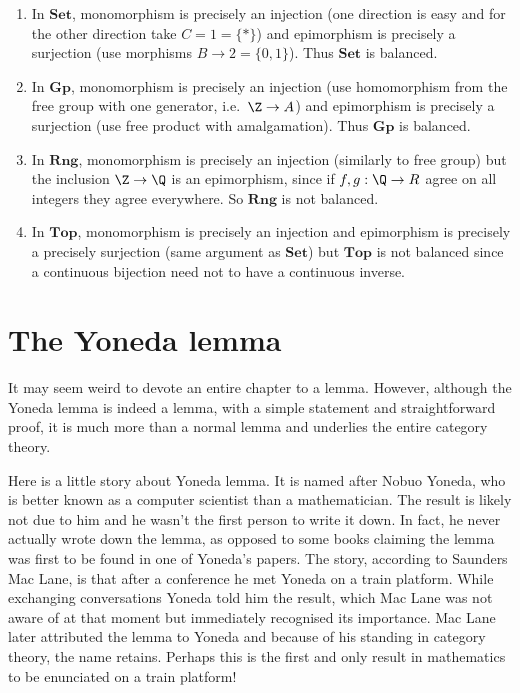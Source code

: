 \documentclass[a4paper]{article}
\renewcommand{\c}[1]{\mathbf{#1}}
\newcommand{\Set}{{\c{Set}}}
\newcommand{\Top}{{\c{Top}}}
\begin{document}
\begin{eg}\leavevmode
  \begin{enumerate}
  \item In \(\Set\), monomorphism is precisely an injection (one direction is easy and for the other direction take \(C = 1 = \{*\}\)) and epimorphism is precisely a surjection (use morphisms \(B \to 2 = \{0, 1\}\)). Thus \(\Set\) is balanced.
  \item In \(\c{Gp}\), monomorphism is precisely an injection (use homomorphism from the free group with one generator, i.e.\ \(\Z \to A\)) and epimorphism is precisely a surjection (use free product with amalgamation). Thus \(\c{Gp}\) is balanced.
  \item In \(\c{Rng}\), monomorphism is precisely an injection (similarly to free group) but the inclusion \(\Z \to \Q\) is an epimorphism, since if \(f, g: \Q \to R\) agree on all integers they agree everywhere. So \(\c{Rng}\) is not balanced.
  \item In \(\Top\), monomorphism is precisely an injection and epimorphism is precisely a precisely surjection (same argument as \(\Set\)) but \(\Top\) is not balanced since a continuous bijection need not to have a continuous inverse.
  \end{enumerate}
\end{eg}

\section{The Yoneda lemma}

It may seem weird to devote an entire chapter to a lemma. However, although the Yoneda lemma is indeed a lemma, with a simple statement and straightforward proof, it is much more than a normal lemma and underlies the entire category theory.

Here is a little story about Yoneda lemma. It is named after Nobuo Yoneda, who is better known as a computer scientist than a mathematician. The result is likely not due to him and he wasn't the first person to write it down. In fact, he never actually wrote down the lemma, as opposed to some books claiming the lemma was first to be found in one of Yoneda's papers. The story, according to Saunders Mac Lane, is that after a conference he met Yoneda on a train platform. While exchanging conversations Yoneda told him the result, which Mac Lane was not aware of at that moment but immediately recognised its importance. Mac Lane later attributed the lemma to Yoneda and because of his standing in category theory, the name retains. Perhaps this is the first and only result in mathematics to be enunciated on a train platform!
\end{document}
